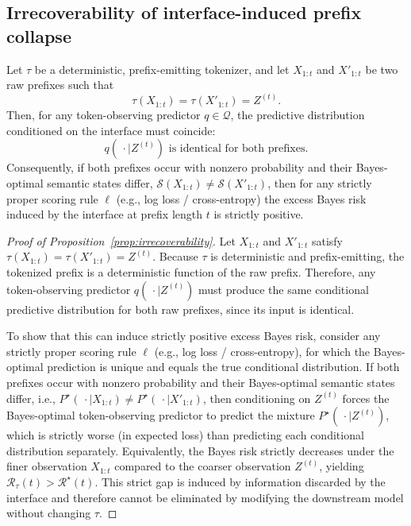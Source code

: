 \subsection{Irrecoverability of interface-induced prefix collapse}
\label{app:irrecoverability}

\begin{proposition}
\label{prop:irrecoverability}
Let $\tau$ be a deterministic, prefix-emitting tokenizer, and let $X_{1:t}$ and $X'_{1:t}$ be two raw prefixes such that
\[
\tau(X_{1:t}) = \tau(X'_{1:t}) = Z^{(t)}.
\]
Then, for any token-observing predictor $q \in \mathcal{Q}$, the predictive distribution conditioned on the interface must coincide:
\[
q(\,\cdot \mid Z^{(t)}) \text{ is identical for both prefixes.}
\]
Consequently, if both prefixes occur with nonzero probability and their Bayes-optimal semantic states differ, $\mathcal{S}(X_{1:t}) \neq \mathcal{S}(X'_{1:t})$, then for any strictly proper scoring rule $\ell$ (e.g., log loss / cross-entropy) the excess Bayes risk induced by the interface at prefix length $t$ is strictly positive.
\end{proposition}

\begin{proof}[Proof of Proposition~\ref{prop:irrecoverability}]
Let $X_{1:t}$ and $X'_{1:t}$ satisfy $\tau(X_{1:t})=\tau(X'_{1:t})=Z^{(t)}$.
Because $\tau$ is deterministic and prefix-emitting, the tokenized prefix is a deterministic function of the raw prefix.
Therefore, any token-observing predictor $q(\,\cdot \mid Z^{(t)})$ must produce the same conditional predictive distribution for both raw prefixes, since its input is identical.

To show that this can induce strictly positive excess Bayes risk, consider any strictly proper scoring rule $\ell$ (e.g., log loss / cross-entropy), for which the Bayes-optimal prediction is unique and equals the true conditional distribution.
If both prefixes occur with nonzero probability and their Bayes-optimal semantic states differ, i.e.,
$P^\star(\,\cdot \mid X_{1:t}) \neq P^\star(\,\cdot \mid X'_{1:t})$,
then conditioning on $Z^{(t)}$ forces the Bayes-optimal token-observing predictor to predict the mixture
$P^\star(\,\cdot \mid Z^{(t)})$, which is strictly worse (in expected loss) than predicting each conditional distribution separately.
Equivalently, the Bayes risk strictly decreases under the finer observation $X_{1:t}$ compared to the coarser observation $Z^{(t)}$, yielding
$\mathcal{R}_\tau(t) > \mathcal{R}^\star(t)$.
This strict gap is induced by information discarded by the interface and therefore cannot be eliminated by modifying the downstream model without changing $\tau$.
\end{proof}

